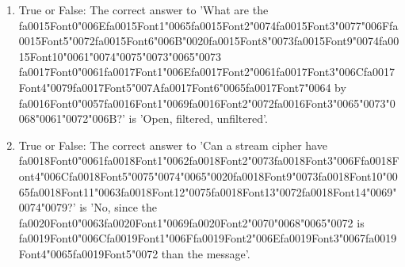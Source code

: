 \documentclass[12pt]{article}
\begin{document}
\begin{enumerate}[label=\arabic*.]
\item True or False: The correct answer to 'What are the {\csname fa0015Font0\endcsname\char"006E}{\csname fa0015Font1\endcsname\char"0065}{\csname fa0015Font2\endcsname\char"0074}{\csname fa0015Font3\endcsname\char"0077}{\char"006F}{\csname fa0015Font5\endcsname\char"0072}{\csname fa0015Font6\endcsname\char"006B}{\char"0020}{\csname fa0015Font8\endcsname\char"0073}{\csname fa0015Font9\endcsname\char"0074}{\csname fa0015Font10\endcsname\char"0061}{\char"0074}{\char"0075}{\char"0073}{\char"0065}{\char"0073} {\csname fa0017Font0\endcsname\char"0061}{\csname fa0017Font1\endcsname\char"006E}{\csname fa0017Font2\endcsname\char"0061}{\csname fa0017Font3\endcsname\char"006C}{\csname fa0017Font4\endcsname\char"0079}{\csname fa0017Font5\endcsname\char"007A}{\csname fa0017Font6\endcsname\char"0065}{\csname fa0017Font7\endcsname\char"0064} by {\csname fa0016Font0\endcsname\char"0057}{\csname fa0016Font1\endcsname\char"0069}{\csname fa0016Font2\endcsname\char"0072}{\csname fa0016Font3\endcsname\char"0065}{\char"0073}{\char"0068}{\char"0061}{\char"0072}{\char"006B}?' is 'Open, filtered, unfiltered'.
\item True or False: The correct answer to 'Can a stream cipher have {\csname fa0018Font0\endcsname\char"0061}{\csname fa0018Font1\endcsname\char"0062}{\csname fa0018Font2\endcsname\char"0073}{\csname fa0018Font3\endcsname\char"006F}{\csname fa0018Font4\endcsname\char"006C}{\csname fa0018Font5\endcsname\char"0075}{\char"0074}{\char"0065}{\char"0020}{\csname fa0018Font9\endcsname\char"0073}{\csname fa0018Font10\endcsname\char"0065}{\csname fa0018Font11\endcsname\char"0063}{\csname fa0018Font12\endcsname\char"0075}{\csname fa0018Font13\endcsname\char"0072}{\csname fa0018Font14\endcsname\char"0069}{\char"0074}{\char"0079}?' is 'No, since the {\csname fa0020Font0\endcsname\char"0063}{\csname fa0020Font1\endcsname\char"0069}{\csname fa0020Font2\endcsname\char"0070}{\char"0068}{\char"0065}{\char"0072} is {\csname fa0019Font0\endcsname\char"006C}{\csname fa0019Font1\endcsname\char"006F}{\csname fa0019Font2\endcsname\char"006E}{\csname fa0019Font3\endcsname\char"0067}{\csname fa0019Font4\endcsname\char"0065}{\csname fa0019Font5\endcsname\char"0072} than the message'.

\end{enumerate}
\end{document}
